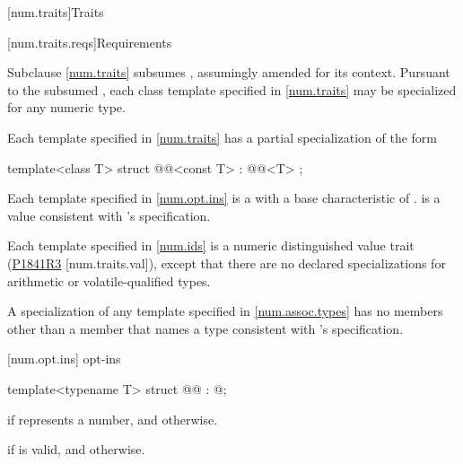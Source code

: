 [num.traits]{Traits}

[num.traits.reqs]{Requirements}

\pnum
Subclause \ref{num.traits} subsumes ,
assumingly amended for its context.
Pursuant to the subsumed ,
each class template specified in \ref{num.traits}
may be specialized for any numeric type.

\pnum
{}%
Each template  specified in \ref{num.traits}
has a partial specialization of the form
\begin{codeblock}
template<class T>
struct @@<const T> : @@<T> { };
\end{codeblock}

\pnum
Each template  specified in \ref{num.opt.ins}
is a 
with a base characteristic of .
 is a value consistent with 's specification.

\pnum
Each template specified in \ref{num.ids}
is a numeric distinguished value trait
(\href{https://wg21.link/P1841R3}{P1841R3} [num.traits.val]),
except that there are no declared specializations for arithmetic or volatile-qualified types.

\pnum
A specialization of any template  specified in \ref{num.assoc.types}
has no members other than a  member
that names a type consistent with 's specification.

[num.opt.ins]{ opt-ins}

\begin{itemdecl}
template<typename T>
struct @@ : @\seebelow@ {};
\end{itemdecl}

\begin{itemdescr}
\pnum
\cvalue
{} if  represents a number, and
 otherwise.

\pnum
\dvalue
{} if  is valid, and
 otherwise.
\end{itemdescr}

